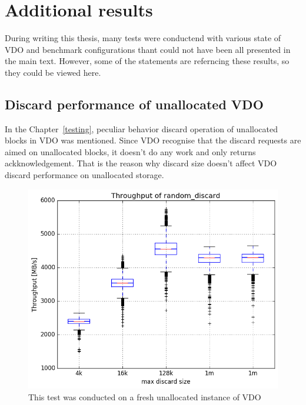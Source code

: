 \documentclass[
  color, %
  table, %
  lof,   %
  lot,   %
]{fithesis3}
\begin{document}
\clearpage
\section{Additional results}
During writing this thesis, many tests were conductend with various state of VDO and benchmark configurations thant could not have been all presented in the main text. However, some of the statements are referncing these results, so they could be viewed here.

\subsection{Discard performance of unallocated VDO}
In the Chapter~\ref{testing}, peculiar behavior discard operation of unallocated blocks in VDO was mentioned. Since VDO recognise that the discard requests are aimed on unallocated blocks, it doesn't do any work and only returns ackknowledgement. That is the reason why discard size doesn't affect VDO discard performance on unallocated storage.

\begin{figure}
\centering
\includegraphics[width=\textwidth]{../results/discards/unalloc_VDO/report/random_discard1_compare_boxplots}
\caption[Discards on unnalocated VDO]{This test was conducted on a fresh unallocated instance of VDO}
\label{fig:discard-unalloc}
\end{figure}






\printbibliography[heading=bibintoc]
\end{document}
